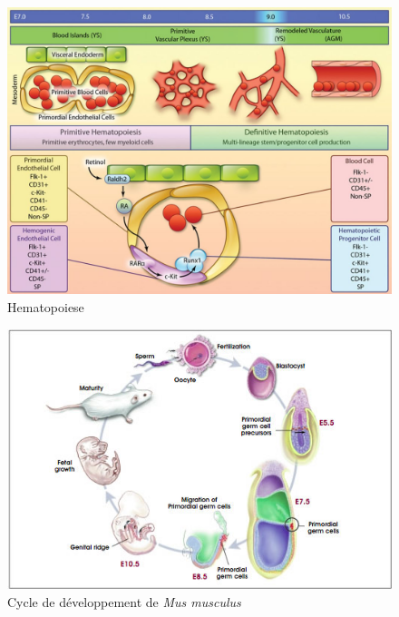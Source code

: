 \documentclass[fleqn,11pt]{SelfArx} %
\begin{document}

\begin{figure}[ht]
\centering
\includegraphics[width=\linewidth]{images/synthese}
\caption{Hematopoiese}
\label{fig:synthese}
\end{figure}


\begin{figure}[ht]
\centering
\includegraphics[width=\linewidth]{images/devptCycle}
\caption{Cycle de développement de \textit{Mus musculus}}
\label{fig:devptCycle}
\end{figure}
\end{document}
